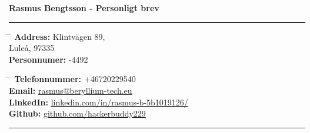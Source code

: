 \documentclass[a4paper]{article}
\begin{document}

\Large{\textbf{Rasmus Bengtsson - Personligt brev}}

\rule{\textwidth}{4px}



\normalsize{
\parbox{0.5\textwidth}{ %
\begin{tabbing} %
\hspace{3cm} \= \hspace{4cm} \= \kill %
{\bf Address:} \> Klintvägen 89,\\ %
\> Luleå, 97335 \\ %
{\bf Personnumer:} -4492 %
\end{tabbing}}
\hfill %
\parbox{0.5\textwidth}{ %
\begin{tabbing} %
\hspace{3cm} \= \hspace{4cm} \= \kill %
{\bf Telefonnummer:} \> +46720229540 \\ %
{\bf Email:} \> \href{mailto:rasmus@beryllium-tech.eu}{rasmus@beryllium-tech.eu} \\ %
{\bf LinkedIn:} \> \href{https://www.linkedin.com/in/rasmus-b-5b1019126/}{linkedin.com/in/rasmus-b-5b1019126/} \\ %
{\bf Github:} \> \href{https://www.github.com/hackerbuddy229}{github.com/hackerbuddy229} %
\end{tabbing}}}



\rule{0.5\textwidth}{2px}
\end{document}
